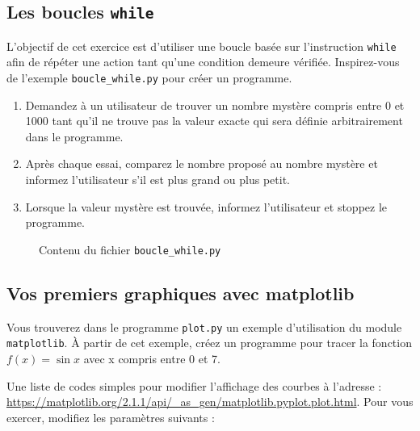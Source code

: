 \subsection{Les boucles  \texttt{while}}

L'objectif de  cet exercice  est d'utiliser une  boucle basée sur l'instruction
\texttt{while}
afin  de  répéter  une  action tant  qu'une  condition demeure  vérifiée.
Inspirez-vous de  l'exemple \texttt{boucle\_while.py}  pour créer  un
programme.

\begin{enumerate}
\item Demandez à  un utilisateur de trouver un  nombre mystère compris
  entre 0 et 1000  tant qu'il ne trouve pas la  valeur exacte qui sera
  définie arbitrairement dans le programme.

\item  Après  chaque essai,  comparez  le  nombre proposé  au  nombre
  mystère et informez l'utilisateur s'il est plus grand ou plus petit.

\item Lorsque la valeur mystère est trouvée, informez l'utilisateur et
  stoppez le programme.

\end{enumerate}

\begin{figure}  
  
  \caption{Contenu du fichier \texttt{boucle\_while.py}}
\end{figure}


\subsection{Vos premiers graphiques avec matplotlib}

Vous  trouverez   dans  le   programme  \texttt{plot.py}   un  exemple
d'utilisation du  module \texttt{matplotlib}. À partir  de cet exemple,
créez  un programme  pour  tracer  la fonction  $f(x)=\sin  x$ avec  x
compris entre 0 et 7.

Une liste de codes simples pour modifier l'affichage des courbes
à l'adresse :\\ \url{https://matplotlib.org/2.1.1/api/_as_gen/matplotlib.pyplot.plot.html}.
Pour vous exercer, modifiez les paramètres suivants :

